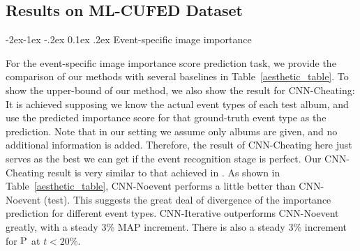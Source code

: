 \documentclass[runningheads]{llncs}
\makeatletter
\renewcommand\subsubsection{\@startsection{subsubsection}{3}{\z@}%
                {-2ex\@plus -1ex \@minus -.2ex}%
                {0.1ex \@plus .2ex}%
                {\normalfont\normalsize\bfseries}}
\makeatother
\begin{document}
\subsection{Results on ML-CUFED Dataset}
\subsubsection{Event-specific image importance}

For the event-specific image importance score prediction task, we provide the comparison of our methods with several baselines in Table~\ref{aesthetic_table}. To show the upper-bound of our method, we also show the result for CNN-Cheating: It is achieved supposing we know the actual event types of each test album, and use the predicted importance score for that ground-truth event type as the prediction. Note that in our setting we assume only albums are given, and no additional information is added. Therefore, the result of CNN-Cheating here just serves as the best we can get if the event recognition stage is perfect. Our CNN-Cheating result is very similar to that achieved in \cite{CVPR}. As shown in Table~\ref{aesthetic_table}, CNN-Noevent performs a little better than CNN-Noevent (test). This suggests the great deal of divergence of the importance prediction for different event types. CNN-Iterative outperforms CNN-Noevent greatly, with a steady 3\% MAP increment. There is also a steady 3\% increment for $\textup{P}$ at $t<20\%$.
\end{document}
